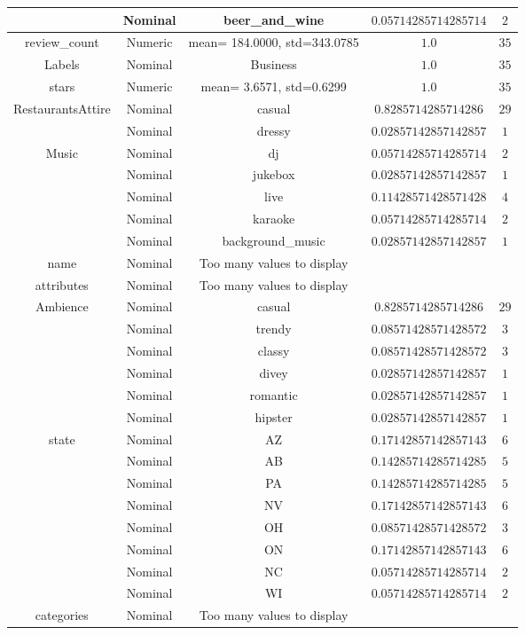 \begin{tabular}{|c|c|c|c|c|}
 & Nominal & beer_and_wine & $0.05714285714285714$ & $2$ \\ \hline 
\multirow{1}{*}{review_count} & Numeric &  mean= 184.0000, std=343.0785 & $1.0$ & $35$ \\ \hline 
\multirow{1}{*}{Labels} & Nominal & Business & $1.0$ & $35$ \\ \hline 
\multirow{1}{*}{stars} & Numeric &  mean= 3.6571, std=0.6299 & $1.0$ & $35$ \\ \hline 
\multirow{2}{*}{RestaurantsAttire} & Nominal & casual & $0.8285714285714286$ & $29$ \\ \cline{2-4} 
 & Nominal & dressy & $0.02857142857142857$ & $1$ \\ \hline 
\multirow{5}{*}{Music} & Nominal & dj & $0.05714285714285714$ & $2$ \\ \cline{2-4} 
 & Nominal & jukebox & $0.02857142857142857$ & $1$ \\ \cline{2-4} 
 & Nominal & live & $0.11428571428571428$ & $4$ \\ \cline{2-4} 
 & Nominal & karaoke & $0.05714285714285714$ & $2$ \\ \cline{2-4} 
 & Nominal & background_music & $0.02857142857142857$ & $1$ \\ \hline 
name & Nominal & Too many values to display & \\ \hline
attributes & Nominal & Too many values to display & \\ \hline
\multirow{6}{*}{Ambience} & Nominal & casual & $0.8285714285714286$ & $29$ \\ \cline{2-4} 
 & Nominal & trendy & $0.08571428571428572$ & $3$ \\ \cline{2-4} 
 & Nominal & classy & $0.08571428571428572$ & $3$ \\ \cline{2-4} 
 & Nominal & divey & $0.02857142857142857$ & $1$ \\ \cline{2-4} 
 & Nominal & romantic & $0.02857142857142857$ & $1$ \\ \cline{2-4} 
 & Nominal & hipster & $0.02857142857142857$ & $1$ \\ \hline 
\multirow{8}{*}{state} & Nominal & AZ & $0.17142857142857143$ & $6$ \\ \cline{2-4} 
 & Nominal & AB & $0.14285714285714285$ & $5$ \\ \cline{2-4} 
 & Nominal & PA & $0.14285714285714285$ & $5$ \\ \cline{2-4} 
 & Nominal & NV & $0.17142857142857143$ & $6$ \\ \cline{2-4} 
 & Nominal & OH & $0.08571428571428572$ & $3$ \\ \cline{2-4} 
 & Nominal & ON & $0.17142857142857143$ & $6$ \\ \cline{2-4} 
 & Nominal & NC & $0.05714285714285714$ & $2$ \\ \cline{2-4} 
 & Nominal & WI & $0.05714285714285714$ & $2$ \\ \hline 
categories & Nominal & Too many values to display & \\ \hline
\end{tabular}



